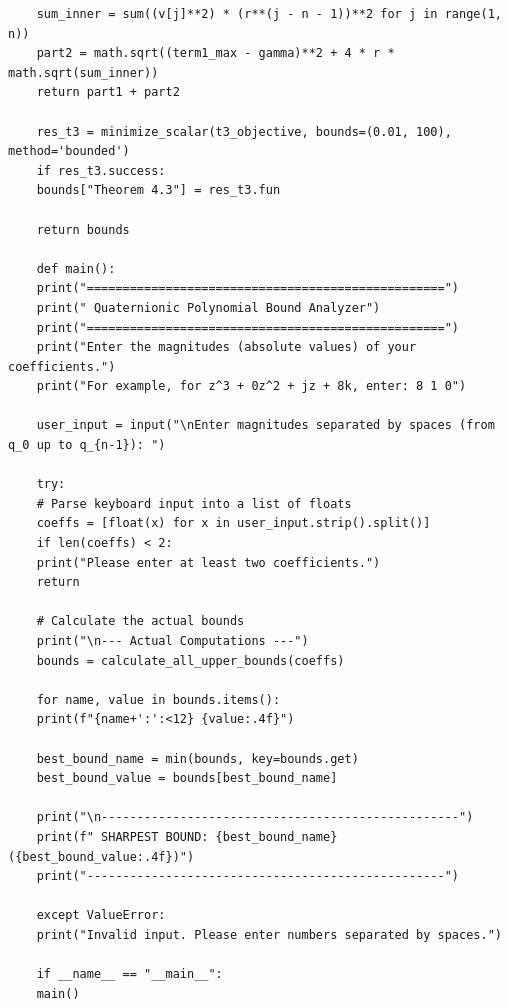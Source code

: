 \documentclass [12pt]{article}
\begin{document}
\begin{lstlisting}
	sum_inner = sum((v[j]**2) * (r**(j - n - 1))**2 for j in range(1, n))
	part2 = math.sqrt((term1_max - gamma)**2 + 4 * r * math.sqrt(sum_inner))
	return part1 + part2
	
	res_t3 = minimize_scalar(t3_objective, bounds=(0.01, 100), method='bounded')
	if res_t3.success:
	bounds["Theorem 4.3"] = res_t3.fun
	
	return bounds
	
	def main():
	print("==================================================")
	print(" Quaternionic Polynomial Bound Analyzer")
	print("==================================================")
	print("Enter the magnitudes (absolute values) of your coefficients.")
	print("For example, for z^3 + 0z^2 + jz + 8k, enter: 8 1 0")
	
	user_input = input("\nEnter magnitudes separated by spaces (from q_0 up to q_{n-1}): ")
	
	try:
	# Parse keyboard input into a list of floats
	coeffs = [float(x) for x in user_input.strip().split()]
	if len(coeffs) < 2:
	print("Please enter at least two coefficients.")
	return
	
	# Calculate the actual bounds
	print("\n--- Actual Computations ---")
	bounds = calculate_all_upper_bounds(coeffs)
	
	for name, value in bounds.items():
	print(f"{name+':':<12} {value:.4f}")
	
	best_bound_name = min(bounds, key=bounds.get)
	best_bound_value = bounds[best_bound_name]
	
	print("\n--------------------------------------------------")
	print(f" SHARPEST BOUND: {best_bound_name} ({best_bound_value:.4f})")
	print("--------------------------------------------------")
	
	except ValueError:
	print("Invalid input. Please enter numbers separated by spaces.")
	
	if __name__ == "__main__":
	main()
\end{lstlisting}
\end{document}
